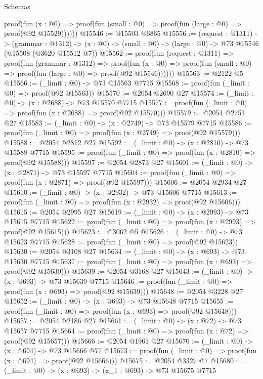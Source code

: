 \begin{lexlean}{Schemas}
\begin{coremodule}
      proof(fun (x : @0) =>
        proof(fun (small : @0) => proof(fun (large : @0) => proof(@92 @15529))))))
@15546 := @15503 @6865
@15556 := (request : @1311) ->
  (grammar : @1312) ->
  (x : @0) -> (small : @0) -> (large : @0) -> @73 @15546 (@15508 (@3620 @15512 @7))
@15562 := proof(fun (request : @1311) =>
    proof(fun (grammar : @1312) =>
      proof(fun (x : @0) =>
        proof(fun (small : @0) => proof(fun (large : @0) => proof(@92 @15546))))))
@15563 := @2122 @5
@15566 := (_limit : @0) -> @73 @15563 @7715
@15568 := proof(fun (_limit : @0) => proof(@92 @15563))
@15570 := @2054 @2690 @27
@15574 := (_limit : @0) -> (x : @2688) -> @73 @15570 @7715
@15577 := proof(fun (_limit : @0) => proof(fun (x : @2688) => proof(@92 @15570)))
@15579 := @2054 @2751 @27
@15583 := (_limit : @0) -> (x : @2749) -> @73 @15579 @7715
@15586 := proof(fun (_limit : @0) => proof(fun (x : @2749) => proof(@92 @15579)))
@15588 := @2054 @2812 @27
@15592 := (_limit : @0) -> (x : @2810) -> @73 @15588 @7715
@15595 := proof(fun (_limit : @0) => proof(fun (x : @2810) => proof(@92 @15588)))
@15597 := @2054 @2873 @27
@15601 := (_limit : @0) -> (x : @2871) -> @73 @15597 @7715
@15604 := proof(fun (_limit : @0) => proof(fun (x : @2871) => proof(@92 @15597)))
@15606 := @2054 @2934 @27
@15610 := (_limit : @0) -> (x : @2932) -> @73 @15606 @7715
@15613 := proof(fun (_limit : @0) => proof(fun (x : @2932) => proof(@92 @15606)))
@15615 := @2054 @2995 @27
@15619 := (_limit : @0) -> (x : @2993) -> @73 @15615 @7715
@15622 := proof(fun (_limit : @0) => proof(fun (x : @2993) => proof(@92 @15615)))
@15623 := @3062 @5
@15626 := (_limit : @0) -> @73 @15623 @7715
@15628 := proof(fun (_limit : @0) => proof(@92 @15623))
@15630 := @2054 @3108 @27
@15634 := (_limit : @0) -> (x : @693) -> @73 @15630 @7715
@15637 := proof(fun (_limit : @0) => proof(fun (x : @693) => proof(@92 @15630)))
@15639 := @2054 @3168 @27
@15643 := (_limit : @0) -> (x : @693) -> @73 @15639 @7715
@15646 := proof(fun (_limit : @0) => proof(fun (x : @693) => proof(@92 @15639)))
@15648 := @2054 @3228 @27
@15652 := (_limit : @0) -> (x : @693) -> @73 @15648 @7715
@15655 := proof(fun (_limit : @0) => proof(fun (x : @693) => proof(@92 @15648)))
@15657 := @2054 @2186 @27
@15661 := (_limit : @0) -> (x : @72) -> @73 @15657 @7715
@15664 := proof(fun (_limit : @0) => proof(fun (x : @72) => proof(@92 @15657)))
@15666 := @2054 @1961 @27
@15670 := (_limit : @0) -> (x : @694) -> @73 @15666 @77
@15673 := proof(fun (_limit : @0) => proof(fun (x : @694) => proof(@92 @15666)))
@15675 := @2054 @3327 @7
@15680 := (_limit : @0) -> (x : @693) -> (x_1 : @693) -> @73 @15675 @7715

\end{coremodule}
\end{lexlean}
